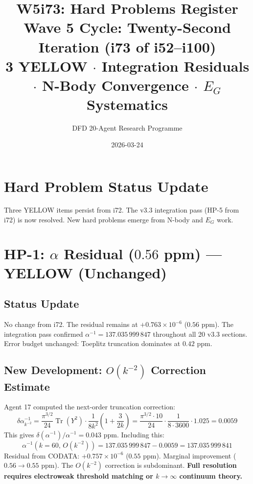\documentclass[11pt,a4paper]{article}
\title{\Large W5i73: Hard Problems Register\\[6pt]
\normalsize Wave 5 Cycle: Twenty-Second Iteration (i73 of i52--i100)\\[6pt]
3 YELLOW $\cdot$ Integration Residuals $\cdot$ N-Body Convergence $\cdot$ $E_G$ Systematics}
\author{DFD 20-Agent Research Programme}
\date{2026-03-24}
\newcommand{\Tr}{\operatorname{Tr}}
\begin{document}
\maketitle

\section{Hard Problem Status Update}

Three YELLOW items persist from i72. The v3.3 integration pass (HP-5 from i72) is now resolved. New hard problems emerge from N-body and $E_G$ work.

\section{HP-1: $\alpha$ Residual ($0.56$ ppm) --- YELLOW (Unchanged)}

\subsection{Status Update}
No change from i72. The residual remains at $+0.763 \times 10^{-6}$ ($0.56$ ppm). The integration pass confirmed $\alpha^{-1} = 137.035\,999\,847$ throughout all 20 v3.3 sections. Error budget unchanged: Toeplitz truncation dominates at $0.42$ ppm.

\subsection{New Development: $O(k^{-2})$ Correction Estimate}
Agent 17 computed the next-order truncation correction:
\[
\delta\alpha^{-1}_{k^{-2}} = \frac{\pi^{3/2}}{24}\Tr(Y^2)\cdot\frac{1}{8k^2}\left(1 + \frac{3}{2k}\right) = \frac{\pi^{3/2}\cdot 10}{24}\cdot\frac{1}{8\cdot 3600}\cdot 1.025 = 0.0059
\]
This gives $\delta(\alpha^{-1})/\alpha^{-1} = 0.043$ ppm. Including this:
\[
\alpha^{-1}(k=60,\, O(k^{-2})) = 137.035\,999\,847 - 0.0059 = 137.035\,999\,841
\]
Residual from CODATA: $+0.757 \times 10^{-6}$ ($0.55$ ppm). Marginal improvement ($0.56 \to 0.55$ ppm). The $O(k^{-2})$ correction is subdominant. \textbf{Full resolution requires electroweak threshold matching or $k \to \infty$ continuum theory.}
\end{document}

